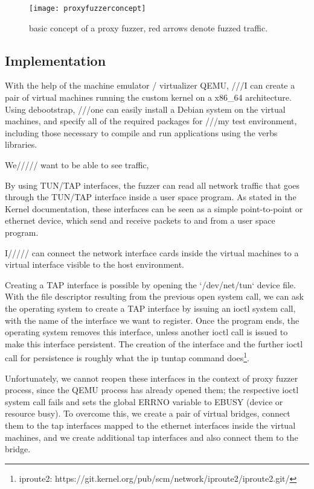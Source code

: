 \begin{figure}[h]
  \centering
  \texttt{[image: proxyfuzzerconcept]}
  \caption[Proxy fuzzer concept]{basic concept of a proxy fuzzer, red arrows denote fuzzed traffic.}
  \label{fig:fuzzerconcept}
\end{figure}

\subsection{Implementation} %

With the help of the machine emulator / virtualizer QEMU, ///I can create a pair of
virtual machines running the custom kernel on a x86\_64 architecture.
Using debootstrap, ///one can easily install a Debian system on
the virtual machines, and specify all of the required packages
for ///my test environment, including those necessary to compile and run applications
using the verbs libraries.

We///// want to be able to see traffic, %

By using TUN/TAP interfaces, the fuzzer can read all network traffic that goes
through the TUN/TAP interface inside a user space program. As stated in
the Kernel documentation, these interfaces can be seen as a simple point-to-point
or ethernet device, which send and receive packets to and from a user space program.

I///// can connect the network interface cards
inside the virtual machines to a virtual interface visible to the host environment.


Creating a TAP interface is possible by opening the `/dev/net/tun` device file.
With the file descriptor resulting from the previous open system call, we can ask the operating system
to create a TAP interface by issuing an ioctl system call, with the name of the interface we want to
register. Once the program ends, the operating system removes this interface, unless another ioctl call
is issued to make this interface persistent. The creation of the interface and the further ioctl call for persistence
is roughly what the ip tuntap command does\footnote{iproute2: https://git.kernel.org/pub/scm/network/iproute2/iproute2.git/ }.



Unfortunately, we cannot reopen these interfaces in the context of proxy fuzzer process, since the QEMU
process has already opened them; the respective ioctl system call fails and sets the
global ERRNO variable to EBUSY (device or resource busy). To overcome this, we create a pair of
virtual bridges, connect them to the tap interfaces mapped to the ethernet interfaces inside the virtual
machines, and we create additional tap interfaces and also connect them to the bridge.

